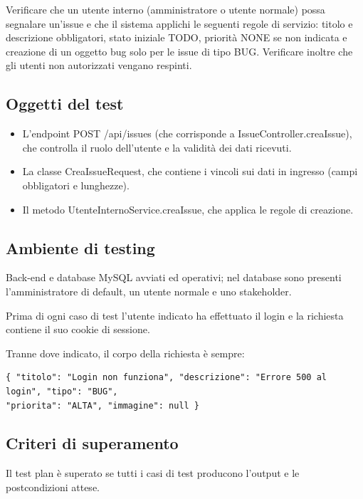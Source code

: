 Verificare che un utente interno (amministratore o utente normale) possa 
segnalare un’issue e che il sistema applichi le seguenti regole di servizio: 
titolo e descrizione obbligatori, stato iniziale TODO, priorità NONE se non 
indicata e creazione di un oggetto bug solo per le issue di tipo BUG.  
Verificare inoltre che gli utenti non autorizzati vengano respinti. 

\subsection{Oggetti del test} 
\begin{itemize}
  \item L'endpoint POST /api/issues (che corrisponde a IssueController.creaIssue), 
che controlla il ruolo dell'utente e la validità dei dati ricevuti. 
\item La classe CreaIssueRequest, che contiene i vincoli sui dati in ingresso 
(campi obbligatori e lunghezze). 
  \item Il metodo UtenteInternoService.creaIssue, che applica le regole di creazione.
  \end{itemize}

\subsection{Ambiente di testing} 

Back-end e database MySQL avviati ed operativi; nel database sono 
presenti l'amministratore di default, un utente normale e uno stakeholder.  

\noindent Prima di ogni caso di test l'utente indicato ha effettuato il login
 e la richiesta contiene il suo cookie di sessione.  

\noindent Tranne dove indicato, il corpo della richiesta è sempre: 

\begin{minipage}{\linewidth}
\begin{verbatim}
{ "titolo": "Login non funziona", "descrizione": "Errore 500 al login", "tipo": "BUG", 
"priorita": "ALTA", "immagine": null } 
\end{verbatim}
\end{minipage}

\subsection{Criteri di superamento}
Il test plan è superato se tutti i casi di test producono l'output e 
le postcondizioni attese.


